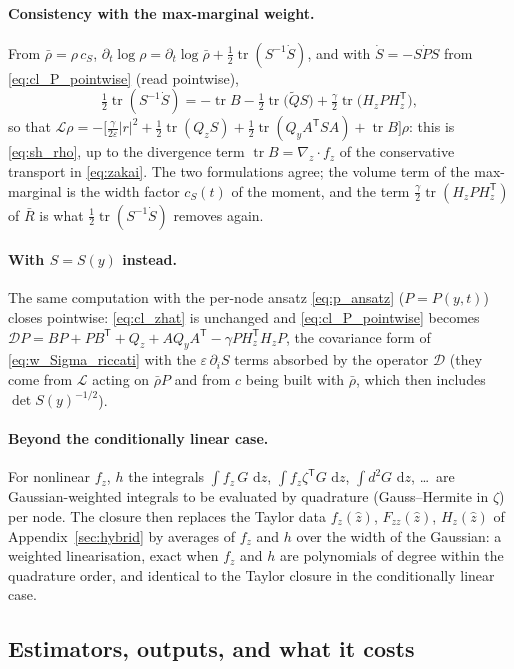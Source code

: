 \documentclass[11pt,a4paper]{article}
\newcommand{\dd}{\,\mathrm{d}}
\newcommand{\tr}{\operatorname{tr}}
\newcommand{\T}{^{\mathsf T}}
\newcommand{\zh}{\hat{z}}
\newcommand{\eps}{\varepsilon}
\newcommand{\abs}[1]{\left\lvert #1 \right\rvert}
\newcommand{\grad}{\nabla}
\theoremstyle{plain}
\theoremstyle{definition}
\theoremstyle{remark}
\begin{document}
\paragraph{Consistency with the max-marginal weight.} From $\bar\rho = \rho\,c_S$, $\partial_t\log\rho = \partial_t\log\bar\rho + \tfrac12\tr(S^{-1}\dot S)$, and with $\dot S = -S\dot PS$ from \eqref{eq:cl_P_pointwise} (read pointwise),
\[
  \tfrac12\tr(S^{-1}\dot S) = -\tr B - \tfrac12\tr\big(\tilde QS\big) + \tfrac\gamma2\tr\big(H_zPH_z\T\big),
\]
so that $\mathcal L\rho = -\big[\tfrac{\gamma}{2\eps}\abs r^2 + \tfrac12\tr(Q_zS) + \tfrac12\tr(Q_yA\T SA) + \tr B\big]\rho$: this is \eqref{eq:sh_rho}, up to the divergence term $\tr B = \grad_z\cdot f_z$ of the conservative transport in \eqref{eq:zakai}. The two formulations agree; the volume term of the max-marginal is the width factor $c_S(t)$ of the moment, and the term $\tfrac\gamma2\tr(H_zPH_z\T)$ of $\bar R$ is what $\tfrac12\tr(S^{-1}\dot S)$ removes again.

\paragraph{With $S=S(y)$ instead.} The same computation with the per-node ansatz \eqref{eq:p_ansatz} ($P=P(y,t)$) closes pointwise: \eqref{eq:cl_zhat} is unchanged and \eqref{eq:cl_P_pointwise} becomes $\mathcal DP = BP + PB\T + Q_z + AQ_yA\T - \gamma PH_z\T H_zP$, the covariance form of \eqref{eq:w_Sigma_riccati} with the $\eps\,\partial_iS$ terms absorbed by the operator $\mathcal D$ (they come from $\mathcal L$ acting on $\bar\rho P$ and from $c$ being built with $\bar\rho$, which then includes $\det S(y)^{-1/2}$).

\paragraph{Beyond the conditionally linear case.} For nonlinear $f_z$, $h$ the integrals $\int f_z\,G\,\dd z$, $\int f_z\zeta\T G\,\dd z$, $\int d^2G\,\dd z$, \dots\ are Gaussian-weighted integrals to be evaluated by quadrature (Gauss--Hermite in $\zeta$) per node. The closure then replaces the Taylor data $f_z(\zh)$, $F_{zz}(\zh)$, $H_z(\zh)$ of Appendix~\ref{sec:hybrid} by averages of $f_z$ and $h$ over the width of the Gaussian: a weighted linearisation, exact when $f_z$ and $h$ are polynomials of degree within the quadrature order, and identical to the Taylor closure in the conditionally linear case.

\subsection{Estimators, outputs, and what it costs}
\end{document}
